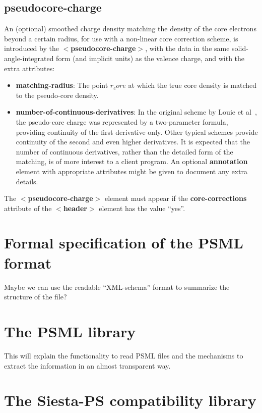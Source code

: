 \documentclass[prb,showpacs,superscriptaddress]{revtex4-1}
\def\tag#1{\textbf{$<$#1$>$}}
\def\att#1{\textbf{#1}}
\begin{document}
\subsection{pseudocore-charge}

An (optional) smoothed charge density matching the density of the core
electrons beyond a certain radius, for use with a non-linear core
correction scheme, is introduced by the \tag{pseudocore-charge}, with
the data in the same solid-angle-integrated form (and implicit units)
as the valence charge, and with the extra attributes:
\begin{itemize}
\item \att{matching-radius}: The point $r_core$ at which the true core
  density is matched to the pseudo-core density.
\item \att{number-of-continuous-derivatives}: In the original scheme
  by Louie et al~\cite{Louie-82}, the pseudo-core charge was
  represented by a two-parameter formula, providing continuity of the
  first derivative only. Other typical schemes provide continuity of
  the second and even higher derivatives. It is expected that the
  number of continuous derivatives, rather than the detailed form of
  the matching, is of more interest to a client program. An optional
  \att{annotation} element with appropriate attributes might be given
  to document any extra details.
\end{itemize}
%
The \tag{pseudocore-charge} element must appear if the
\att{core-corrections} attribute of the \tag{header} element has the
value ``yes''.

\section{Formal specification of the PSML format}

Maybe we can use the readable ``XML-schema'' format to summarize the
structure of the file?

\section{The PSML library}

This will explain the functionality to read PSML files and the
mechanisms to extract the information in an almost transparent way.


\section{The Siesta-PS compatibility library}
\end{document}
